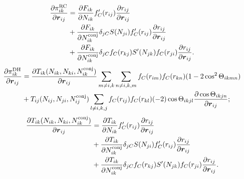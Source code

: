 \documentclass[12pt,a4paper]{report}
\newcommand{\vect}[1]{\boldsymbol{#1}}
\begin{document}
\begin{align} 
\frac{\partial  \pi_{ik}^{\rm RC}}{\partial \vect{r}_{ij}} 
&= \frac{\partial F_{ik}}{\partial N_{ik}} f'_C(r_{ij}) \frac{\partial r_{ij}}{\partial \vect{r}_{ij}} \nonumber \\
&+ \frac{\partial F_{ik}}{\partial N_{ik}^{\rm conj}} \delta_{jC} S(N_{ji}) f'_C(r_{ij}) \frac{\partial r_{ij}}{\partial \vect{r}_{ij}} \nonumber \\
&+ \frac{\partial F_{ik}}{\partial N_{ik}^{\rm conj}} \delta_{jC}  f_C(r_{kj}) S'(N_{jk})f_C(r_{ji}) \frac{\partial r_{ij}}{\partial \vect{r}_{ij}}. 
\end{align}
\begin{align} 
\frac{\partial  \pi_{ik}^{\rm DH}}{\partial \vect{r}_{ij}} 
&= \frac{\partial T_{ik}(N_{ik},N_{ki},N_{ik}^{\rm conj}) } {\partial \vect{r}_{ij}} 
\sum_{m\neq i,k}\sum_{n\neq i,k,m} f_{C}(r_{im}) f_{C}(r_{kn}) (1-2\cos^2\Theta_{ikmn}) \nonumber \\
&+T_{ij}(N_{ij},N_{ji},N_{ij}^{\rm conj}) 
\sum_{l\neq i,k,j} f_{C}(r_{ij}) f_{C}(r_{kl}) (-2)\cos\Theta_{ikjl} 
\frac{\partial \cos\Theta_{ikjn}}{\partial \vect{r}_{ij}};
\end{align}
\begin{align} 
\frac{\partial  T_{ik}(N_{ik},N_{ki},N_{ik}^{\rm conj})}{\partial \vect{r}_{ij}} 
&= \frac{\partial T_{ik}}{\partial N_{ik}} f'_C(r_{ij}) \frac{\partial r_{ij}}{\partial \vect{r}_{ij}} \nonumber \\
&+ \frac{\partial T_{ik}}{\partial N_{ik}^{\rm conj}} \delta_{jC} S(N_{ji}) f'_C(r_{ij}) \frac{\partial r_{ij}}{\partial \vect{r}_{ij}} \nonumber \\
&+ \frac{\partial T_{ik}}{\partial N_{ik}^{\rm conj}} \delta_{jC}  f_C(r_{kj}) S'(N_{jk})f_C(r_{ji}) \frac{\partial r_{ij}}{\partial \vect{r}_{ij}}. 
\end{align}
\end{document}
